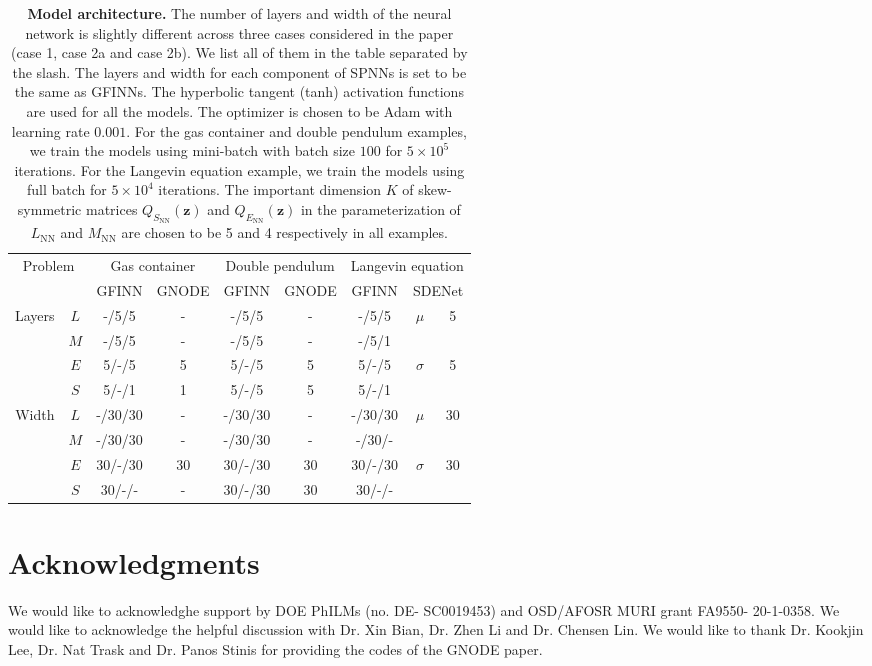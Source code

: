 \documentclass[openacc]{rsproca_new}%
\newcommand{\z}{\bm{z}}
\begin{document}
\begin{table}[htbp]
\centering
\begin{tabular}{|c|c|c|c|c|c|c|c|c|}
\hline
\multicolumn{2}{|c|}{\multirow{2}{*}{Problem}} & \multicolumn{2}{c|}{Gas container} & \multicolumn{2}{c|}{Double pendulum} & \multicolumn{3}{c|}{Langevin equation} \\ \cline{3-9}
\multicolumn{2}{|c|}{} & GFINN & GNODE & GFINN & GNODE & GFINN & \multicolumn{2}{c|}{SDENet} \\ \hline
\multirow{4}{*}{Layers}
 & $L$ & -/5/5 & - & -/5/5 & - & -/5/5 & \multirow{2}{*}{$\mu$} & \multirow{2}{*}{5}\\ \cline{2-7}
 & $M$ & -/5/5 & - & -/5/5  & -  & -/5/1 & &\\ \cline{2-9}
 & $E$ & 5/-/5 & 5 & 5/-/5 & 5 & 5/-/5 &\multirow{2}{*}{$\sigma$} & \multirow{2}{*}{5}\\ \cline{2-7}
 & $S$ & 5/-/1 & 1 & 5/-/5 & 5  & 5/-/1 & &\\ \hline
\multirow{4}{*}{Width}
 & $L$ & -/30/30 & - & -/30/30 & - & -/30/30 & \multirow{2}{*}{$\mu$} &\multirow{2}{*}{30}\\ \cline{2-7}
 & $M$ & -/30/30 & - & -/30/30 & - & -/30/- & &\\ \cline{2-9}
 & $E$ & 30/-/30 & 30 & 30/-/30 & 30 & 30/-/30 & \multirow{2}{*}{$\sigma$} &\multirow{2}{*}{30}\\ \cline{2-7}
 & $S$ & 30/-/- & - & 30/-/30  & 30  & 30/-/- & &\\ \hline
\end{tabular}
\caption{\textbf{Model architecture.} The number of layers and width of the neural network is slightly different across three cases considered in the paper (case 1, case 2a and case 2b). We list all of them in the table separated by the slash. The layers and width for each component of SPNNs is set to be the same as GFINNs. The hyperbolic tangent (tanh) activation functions are used for all the models. The optimizer is chosen to be Adam \cite{adam2015} with learning rate $0.001$. For the gas container and double pendulum examples, we train the models using mini-batch with batch size $100$ for $5\times 10^{5}$ iterations. For the Langevin equation example, we train the models using full batch for $5\times 10^{4}$ iterations. The important dimension $K$ of skew-symmetric matrices $Q_{S_{\text{NN}}}(\z)$ and $Q_{E_{\text{NN}}}(\z)$ in the parameterization of $L_{\text{NN}}$ and $M_{\text{NN}}$ are chosen to be 5 and 4 respectively in all examples. }
\label{tab:model_params}
\end{table}

\section*{Acknowledgments}
 We would like to acknowledghe support by DOE PhILMs (no. DE- SC0019453) and OSD/AFOSR MURI grant FA9550-
20-1-0358. We would like to acknowledge the helpful discussion with Dr. Xin Bian, Dr. Zhen Li and Dr. Chensen Lin. We would like to thank Dr. Kookjin Lee, Dr. Nat Trask and Dr. Panos Stinis for providing the codes of the GNODE paper.



\end{document}
